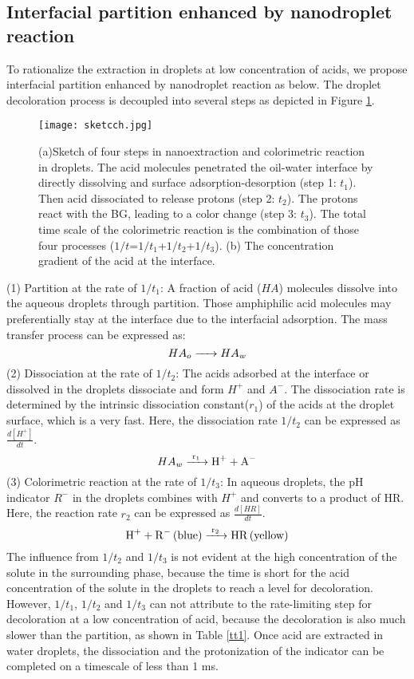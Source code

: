 \documentclass[journal=langd5,manuscript=article]{achemso}
\begin{document}
\subsection{Interfacial partition enhanced by nanodroplet reaction }
To rationalize the extraction in droplets at low concentration of acids, we propose interfacial partition enhanced by nanodroplet reaction as below. The droplet decoloration process is decoupled into several steps as depicted in Figure \ref{sk2}.  
\begin{figure}[htp]
	\texttt{[image: sketcch.jpg]}
	\caption{(a)Sketch of four steps in nanoextraction and colorimetric reaction in droplets. The acid molecules penetrated the oil-water interface by directly dissolving and surface adsorption-desorption (step 1: $t_1$). Then acid dissociated to release protons (step 2: $t_2$). The protons react with the BG, leading to a color change (step 3: $t_3$). The total time scale of the colorimetric reaction is the combination of those four processes ($1/t$=$1/t_1$+$1/t_2$+$1/t_3$). (b) The concentration gradient of the acid at the interface.}
	\label{sk2}
\end{figure}
(1) Partition at the rate of $1/t_1$: A fraction of acid ($HA$) molecules dissolve into the aqueous droplets through partition. Those amphiphilic acid molecules may preferentially stay at the interface due to the interfacial adsorption. The mass transfer process can be expressed as:
\begin{equation}
\ce{$HA_o$ ->$HA$_w}
\label{partition}
\end{equation}
(2) Dissociation at the rate of $1/t_2$: The acids adsorbed at the interface or dissolved in the droplets dissociate and form $H^+$ and $A^-$. The dissociation rate is determined by the intrinsic dissociation constant($r_1$) of the acids at the droplet surface, which is a very fast. Here, the dissociation rate $1/t_2$ can be expressed as $\frac{d[H^+]}{dt}$. 
\begin{equation}
\ce{$HA_w$ ->[{r_1}]H^+ + A^-}
\label{er1}
\end{equation}
(3) Colorimetric reaction at the rate of $1/t_3$: In aqueous droplets, the pH indicator $R^-$ in the droplets combines with $H^+$ and converts to a product of HR. Here, the reaction rate $r_2$ can be expressed as $\frac{d[HR]}{dt}$.
\begin{equation}
\ce{H^+ + R^- (blue) ->[{r_2}]HR (yellow)}
\label{er2}
\end{equation}
The influence from $1/t_2$ and $1/t_3$ is not evident at the high concentration of the solute in the surrounding phase, because the time is short for the acid concentration of the solute in the droplets to reach a level for decoloration. However, $1/t_1$, $1/t_2$ and $1/t_3$ can not attribute to the rate-limiting step for decoloration at a low concentration of acid, because the decoloration is also much slower than the partition, as shown in Table \ref{tt1}. Once acid are extracted in water droplets, the dissociation and the protonization of the indicator can be completed on a timescale of less than 1 ms.
\end{document}

